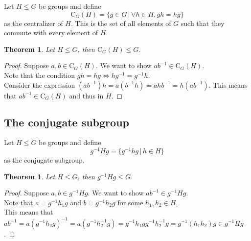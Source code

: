 \documentclass[a4paper]{article}
\begin{document}
Let \(H \leq G\) be groups and define
\[
    \text{C}_G(H) = \{
        g \in G \,|\, \forall h \in H, gh=hg
    \}
\]
as the centralizer of \(H\).
This is the set of all elements of \(G\) such that they commute with every element of \(H\).

\newtheorem*{theorem2}{Theorem}

\begin{theorem2}
    Let \(H \leq G\), then \(\text{C}_G(H) \leq G\).
\end{theorem2}
\begin{proof}
    Suppose \(a,b \in \text{C}_G(H)\).
    We want to show \(ab^{-1} \in \text{C}_G(H)\).\\
    Note that the condition \(gh=hg \iff hg^{-1}=g^{-1}h\).\\
    Consider the expression \((ab^{-1})h = a(b^{-1}h) = ahb^{-1} = h(ab^{-1})\).
    This means that \(ab^{-1} \in \text{C}_G(H)\) and thus in \(H\).
\end{proof}

\subsection{The conjugate subgroup}

Let \(H \leq G\) be groups and define
\[
    g^{-1}Hg = \{
        g^{-1}hg \,|\, h \in H    
    \}
\]
as the conjugate subgroup.

\newtheorem*{theorem3}{Theorem}

\begin{theorem3}
    Let \(H \leq G\), then \(g^{-1}Hg \leq G\).
\end{theorem3}
\begin{proof}
    Suppose \(a,b \in g^{-1}Hg\).
    We want to show \(ab^{-1} \in g^{-1}Hg\).\\
    Note that \(a = g^{-1}h_1g\) and \(b = g^{-1}h_2g\)
    for some \(h_1, h_2 \in H\). \\
    This means that \(ab^{-1}=a{(g^{-1}h_2g)}^{-1} = a(g^{-1}h_2^{-1}g)
    =g^{-1}h_1gg^{-1}h_2^{-1}g = g^{-1} (h_1h_2) g \in g^{-1}Hg \).
\end{proof}
\end{document}
